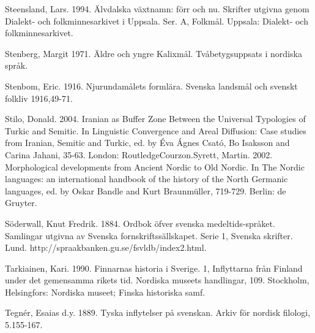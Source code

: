 \begin{styleBodytextC}
Steensland, Lars. 1994. Älvdalska växtnamn: förr och nu. Skrifter utgivna genom Dialekt- och folkminnesarkivet i Uppsala. Ser. A, Folkmål. Uppsala: Dialekt- och folkminnesarkivet.

\end{styleBodytextC}

\begin{styleBodytextC}
Stenberg, Margit 1971. Äldre och yngre Kalixmål. Tvåbetygsuppsats i nordiska språk.

\end{styleBodytextC}

\begin{styleBodytextC}
Stenbom, Eric. 1916. Njurundamålets formlära. Svenska landsmål och svenskt folkliv 1916,49-71.

\end{styleBodytextC}

\begin{styleBodytextC}
Stilo, Donald. 2004. Iranian as Buffer Zone Between the Universal Typologies of Turkic and Semitic. In Linguistic Convergence and Areal Diffusion: Case studies from Iranian, Semitic and Turkic, ed. by Éva Ágnes Csató, Bo Isaksson and Carina Jahani, 35-63. London: RoutledgeCourzon.Syrett, Martin. 2002. Morphological developments from Ancient Nordic to Old Nordic. In The Nordic languages: an international handbook of the history of the North Germanic languages, ed. by Oskar Bandle and Kurt Braunmüller, 719-729. Berlin: de Gruyter.

\end{styleBodytextC}

\begin{styleBodytextC}
Söderwall, Knut Fredrik. 1884. Ordbok öfver svenska medeltids-språket. Samlingar utgivna av Svenska fornskriftssällskapet. Serie 1, Svenska skrifter. Lund. http://spraakbanken.gu.se/fsvldb/index2.html.

\end{styleBodytextC}

\begin{styleBodytextC}
Tarkiainen, Kari. 1990. Finnarnas historia i Sverige. 1, Inflyttarna från Finland under det gemensamma rikets tid. Nordiska museets handlingar, 109. Stockholm, Helsingfors: Nordiska museet; Finska historiska samf.

\end{styleBodytextC}

\begin{styleBodytextC}
Tegnér, Esaias d.y. 1889. Tyska inflytelser på svenskan. Arkiv för nordisk filologi, 5.155-167.

\end{styleBodytextC}

